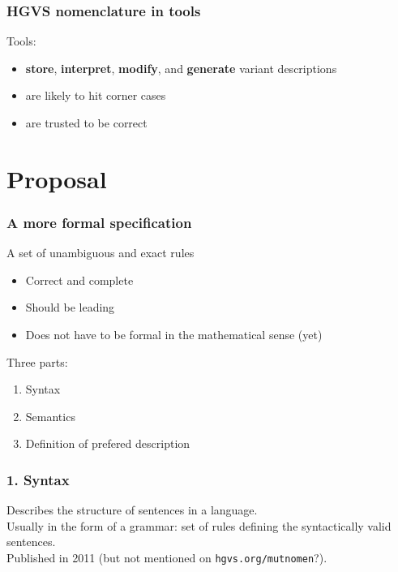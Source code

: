 \documentclass[14pt]{beamer}
\begin{document}
\begin{frame}
  \frametitle{\textcolor{hgvs}{HGVS} nomenclature in tools}
  Tools:
  \begin{itemize}[<+->]
    \item \textbf{store}, \textbf{interpret}, \textbf{modify}, and
      \textbf{generate} variant descriptions
    \item are likely to hit corner cases
    \item are trusted to be correct\\[2em]
  \end{itemize}
\end{frame}


\section{Proposal}




\begin{frame}
  \frametitle{A more formal specification}

  \begin{block}{A set of unambiguous and exact rules}
    \begin{itemize}
      \item \textcolor{hgvs}{Correct} and \textcolor{hgvs}{complete}
      \item Should be \textcolor{hgvs}{leading}
      \item Does not have to be formal in the mathematical sense (yet)
    \end{itemize}
  \end{block}
  \pause
  Three parts:
  \begin{enumerate}
    \item Syntax
    \item Semantics
    \item Definition of prefered description
  \end{enumerate}
\end{frame}


\begin{frame}[fragile]
  \frametitle{1. Syntax }
  Describes the \textcolor{hgvs}{structure} of sentences in a language.\\[2em]

  Usually in the form of a \textcolor{hgvs}{grammar}: set of rules defining
  the syntactically valid sentences.\\[2em]

  \pause
  Published in 2011 (but not mentioned on \verb|hgvs.org/mutnomen|?).
\end{frame}
\end{document}
